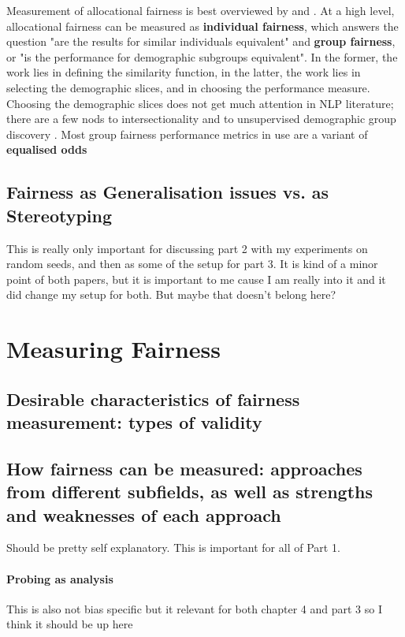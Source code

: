 Measurement of allocational fairness is best overviewed by \citet{hutchinson_mitchell_2019} and \citet{barocas-hardt-narayanan}. At a high level, allocational fairness can be measured as \textbf{individual fairness}, which answers the question "are the results for similar individuals equivalent" and \textbf{group fairness}, or "is the performance for demographic subgroups equivalent". In the former, the work lies in defining the similarity function, in the latter, the work lies in selecting the demographic slices, and in choosing the performance measure. Choosing the demographic slices does not get much attention in NLP literature; there are a few nods to intersectionality \citep{} and to unsupervised demographic group discovery \citep{zhao-chang-2020-logan}. Most group fairness performance metrics in use are a variant of \textbf{equalised odds} \citep{hardt2016equality} 



\subsection{Fairness as Generalisation issues vs. as Stereotyping}
This is really only important for discussing part 2 with my experiments on random seeds, and then as some of the setup for part 3. It is kind of a minor point of both papers, but it is important to me cause I am really into it and it did change my setup for both. But maybe that doesn't belong here?

\section{Measuring Fairness}
\subsection{Desirable characteristics of fairness measurement: types of validity}

\subsection{How fairness can be measured: approaches from different subfields, as well as strengths and weaknesses of each approach} Should be pretty self explanatory. This is important for all of Part 1.

\paragraph{Probing as analysis}
This is also not bias specific but it relevant for both chapter 4 and part 3 so I think it should be up here

